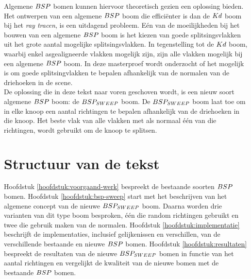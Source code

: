 Algemene $BSP$ bomen kunnen hiervoor theoretisch gezien een oplossing bieden.
Het ontwerpen van een algemene $BSP$ boom die efficiënter is dan de $Kd$ boom bij het \textit{ray tracen}, is een uitdagend probleem.
Eén van de moeilijkheden bij het bouwen van een algemene $BSP$ boom is het kiezen van goede splitsingsvlakken uit het grote aantal mogelijke splitsingsvlakken.
In tegenstelling tot de $Kd$ boom, waarbij enkel asgealigneerde vlakken mogelijk zijn, zijn alle vlakken mogelijk bij een algemene $BSP$ boom.
In deze masterproef wordt onderzocht of het mogelijk is om goede splitsingvlakken te bepalen afhankelijk van de normalen van de driehoeken in de scene.\\

De oplossing die in deze tekst naar voren geschoven wordt, is een nieuw soort algemene $BSP$ boom: de $BSP_{SWEEP}$ boom.
De $BSP_{SWEEP}$ boom laat toe om in elke knoop een aantal richtingen te bepalen afhankelijk van de driehoeken in die knoop.
Het beste vlak van alle vlakken met als normaal één van die richtingen, wordt gebruikt om de knoop te splitsen.

\section{Structuur van de tekst}
Hoofdstuk \ref{hoofdstuk:voorgaand-werk} bespreekt de bestaande soorten $BSP$ bomen. Hoofdstuk \ref{hoofdstuk:bsp-sweep} start met het beschrijven van het algemene concept van de nieuwe $BSP_{SWEEP}$ boom. Daarna worden drie varianten van dit type boom besproken, één die random richtingen gebruikt en twee die gebruik maken van de normalen. Hoofdstuk \ref{hoofdstuk:implementatie} beschrijft de implementaties, inclusief gelijkenissen en verschillen, van de verschillende bestaande en nieuwe $BSP$ bomen. Hoofdstuk \ref{hoofdstuk:resultaten} bespreekt de resultaten van de nieuwe $BSP_{SWEEP}$ bomen in functie van het aantal richtingen en vergelijkt de kwaliteit van de nieuwe bomen met de bestaande $BSP$ bomen.

